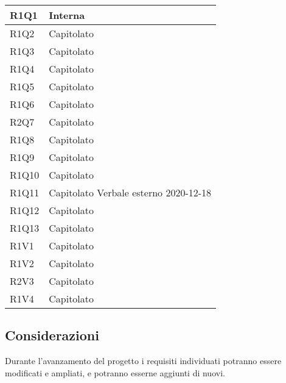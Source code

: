 \begin{center}
\begin{longtable}{|p{22mm}|p{22mm}|}
R1Q1 &
Interna \newline
\\
\hline

R1Q2 &
Capitolato \newline
\\
\hline

R1Q3 &
Capitolato \newline
\\
\hline

R1Q4 &
Capitolato \newline
\\
\hline

R1Q5 &
Capitolato \newline
\\
\hline

R1Q6 &
Capitolato \newline
\\
\hline

R2Q7 &
Capitolato \newline
\\
\hline

R1Q8 &
Capitolato \newline
\\
\hline

R1Q9 &
Capitolato \newline
\\
\hline

R1Q10 &
Capitolato \newline
\\
\hline

R1Q11 &
Capitolato \newline
Verbale esterno 2020-12-18 \newline
\\
\hline

R1Q12 &
Capitolato \newline
\\
\hline

R1Q13 &
Capitolato \newline
\\
\hline

R1V1 &
Capitolato \newline
\\
\hline

R1V2 &
Capitolato \newline
\\
\hline

R2V3 &
Capitolato \newline
\\
\hline

R1V4 &
Capitolato \newline
\\
\hline
	
	\end{longtable}
\end{center}

\subsection{Considerazioni}
Durante l'avanzamento del progetto i requisiti individuati potranno essere modificati e ampliati, e potranno esserne aggiunti di nuovi.